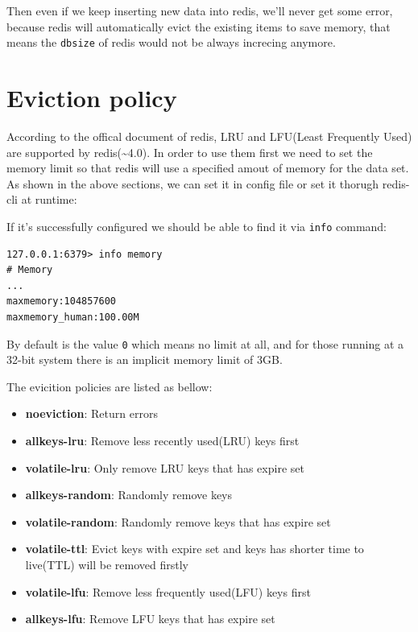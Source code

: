 \documentclass[12pt]{article}
\begin{document}
Then even if we keep inserting new data into redis, we'll never get some error, because redis will automatically evict the existing items to save memory, that means the \texttt{dbsize} of redis would not be always increcing anymore.

\section{Eviction policy}\label{eviction-policy}

According to the offical document of redis, LRU and LFU(Least Frequently Used) are supported by redis(\textasciitilde4.0). In order to use them first we need to set the memory limit so that redis will use a specified amout of memory for the data set. As shown in the above sections, we can set it in config file or set it thorugh redis-cli at runtime:

\begin{Shaded}
\begin{Highlighting}[]
\end{Highlighting}
\end{Shaded}

If it's successfully configured we should be able to find it via \texttt{info} command:

\begin{verbatim}
127.0.0.1:6379> info memory
# Memory
...
maxmemory:104857600
maxmemory_human:100.00M
\end{verbatim}

By default is the value \texttt{0} which means no limit at all, and for those running at a 32-bit system there is an implicit memory limit of 3GB.

The evicition policies are listed as bellow:

\begin{itemize}
\tightlist
\item
  \textbf{noeviction}: Return errors
\item
  \textbf{allkeys-lru}: Remove less recently used(LRU) keys first
\item
  \textbf{volatile-lru}: Only remove LRU keys that has expire set
\item
  \textbf{allkeys-random}: Randomly remove keys
\item
  \textbf{volatile-random}: Randomly remove keys that has expire set
\item
  \textbf{volatile-ttl}: Evict keys with expire set and keys has shorter time to live(TTL) will be removed firstly
\item
  \textbf{volatile-lfu}: Remove less frequently used(LFU) keys first
\item
  \textbf{allkeys-lfu}: Remove LFU keys that has expire set
\end{itemize}
\end{document}
